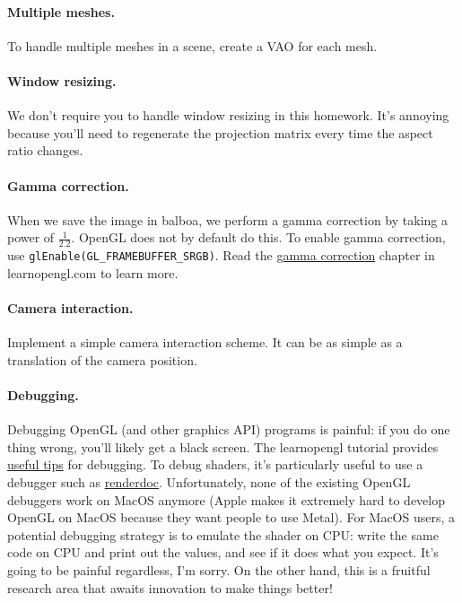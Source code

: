 \paragraph{Multiple meshes.} To handle multiple meshes in a scene, create a VAO for each mesh.

\paragraph{Window resizing.} We don't require you to handle window resizing in this homework. It's annoying because you'll need to regenerate the projection matrix every time the aspect ratio changes.

\paragraph{Gamma correction.} When we save the image in balboa, we perform a gamma correction by taking a power of $\frac{1}{2.2}$. OpenGL does not by default do this. To enable gamma correction, use \lstinline{glEnable(GL_FRAMEBUFFER_SRGB)}. Read the \href{https://learnopengl.com/Advanced-Lighting/Gamma-Correction}{gamma correction} chapter in learnopengl.com to learn more.

\paragraph{Camera interaction.} Implement a simple camera interaction scheme. It can be as simple as a translation of the camera position.

\paragraph{Debugging.} Debugging OpenGL (and other graphics API) programs is painful: if you do one thing wrong, you'll likely get a black screen. The learnopengl tutorial provides \href{https://learnopengl.com/In-Practice/Debugging}{useful tips} for debugging. To debug shaders, it's particularly useful to use a debugger such as \href{https://renderdoc.org/}{renderdoc}. Unfortunately, none of the existing OpenGL debuggers work on MacOS anymore (Apple makes it extremely hard to develop OpenGL on MacOS because they want people to use Metal). For MacOS users, a potential debugging strategy is to emulate the shader on CPU: write the same code on CPU and print out the values, and see if it does what you expect. It's going to be painful regardless, I'm sorry. On the other hand, this is a fruitful research area that awaits innovation to make things better!

